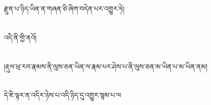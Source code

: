 རྫུན་པ་ཉིད་ཡིན་ན་གཞན་ཅི་ཞིག་བདེན་པར་འགྱུར་ཏེ།\chapter{ }འདི་ནི་གྱི་ནའོ།\chapter{ }།རྡུལ་ཕྲ་རབ་རྣམས་ནི་ལུས་ཅན་ཡིན་ལ་རྣམ་པར་ཤེས་པ་ནི་ལུས་ཅན་མ་ཡིན་པ་མ་ཡིན་ནམ།\chapter{ }དེ་ཇི་ལྟར་ན་འདིར་ཉེས་པ་འདི་ཉིད་དུ་འགྱུར་སྙམ་པ་ལ།\c